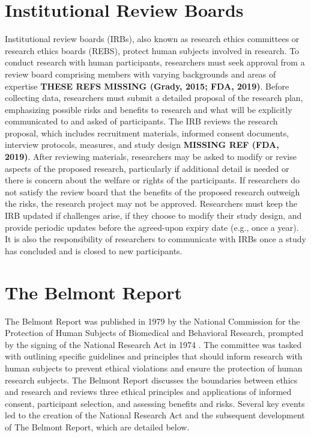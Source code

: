 \documentclass[
  11pt,
]{book}
\begin{document}
\section{Institutional Review Boards}\label{institutional-review-boards}

Institutional review boards (IRBs), also known as research ethics committees or research ethics boards (REBS), protect human subjects involved in research. To conduct research with human participants, researchers must seek approval from a review board comprising members with varying backgrounds and areas of expertise \textbf{THESE REFS MISSING (Grady, 2015; FDA, 2019)}. Before collecting data, researchers must submit a detailed proposal of the research plan, emphasizing possible risks and benefits to research and what will be explicitly communicated to and asked of participants. The IRB reviews the research proposal, which includes recruitment materials, informed consent documents, interview protocols, measures, and study design \textbf{MISSING REF (FDA, 2019)}. After reviewing materials, researchers may be asked to modify or revise aspects of the proposed research, particularly if additional detail is needed or there is concern about the welfare or rights of the participants. If researchers do not satisfy the review board that the benefits of the proposed research outweigh the risks, the research project may not be approved. Researchers must keep the IRB updated if challenges arise, if they choose to modify their study design, and provide periodic updates before the agreed-upon expiry date (e.g., once a year). It is also the responsibility of researchers to communicate with IRBs once a study has concluded and is closed to new participants.

\section{The Belmont Report}\label{the-belmont-report}

The Belmont Report was published in 1979 by the National Commission for the Protection of Human Subjects of Biomedical and Behavioral Research, prompted by the signing of the National Research Act in 1974 \citep{national_commission_for_the_protection_of_human_subjects_of_biomedical_and_behavioral_research_belmont_1979}. The committee was tasked with outlining specific guidelines and principles that should inform research with human subjects to prevent ethical violations and ensure the protection of human research subjects. The Belmont Report discusses the boundaries between ethics and research and reviews three ethical principles and applications of informed consent, participant selection, and assessing benefits and risks. Several key events led to the creation of the National Research Act and the subsequent development of The Belmont Report, which are detailed below.
\end{document}
